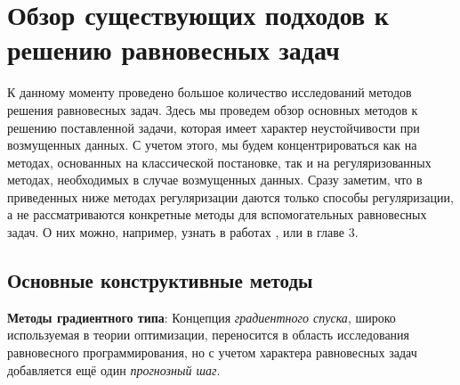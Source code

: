 \section{Обзор существующих подходов к решению \newline равновесных задач}
К данному моменту проведено большое количество исследований методов решения равновесных задач. Здесь мы проведем обзор основных методов к решению поставленной задачи, которая имеет характер неустойчивости при возмущенных данных. С учетом этого, мы будем концентрироваться как на методах, основанных на классической постановке, так и на регуляризованных методах, необходимых в случае возмущенных данных. Сразу заметим, что в приведенных ниже методах регуляризации даются только способы регуляризации, а не рассматриваются конкретные методы для вспомогательных равновесных задач. О них можно, например, узнать в работах \cite{centralbib-2}\cite{15}\cite{16}, или в главе 3.
\subsection{Основные конструктивные методы}
\textbf{Методы градиентного типа}: Концепция \textit{градиентного спуска}, широко используемая в теории оптимизации, переносится в область исследования равновесного программирования, но с учетом характера равновесных задач добавляется ещё один \textit{прогнозный шаг}. 

